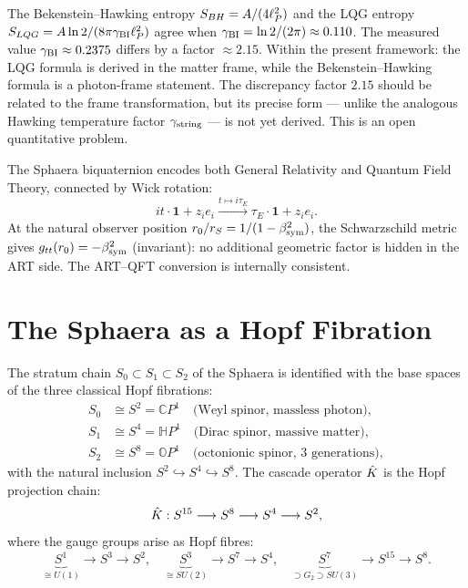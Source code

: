 \begin{remark}
The Bekenstein--Hawking entropy $S_{BH}=A/(4\ell_P^2)$ and the LQG entropy
$S_{LQG}=A\ln 2/(8\pi\gamma_{\mathrm{BI}}\ell_P^2)$ agree when $\gamma_{\mathrm{BI}}=\ln 2/(2\pi)\approx 0.110$.
The measured value $\gamma_{\mathrm{BI}}\approx 0.2375$ differs by a factor $\approx 2.15$.
Within the present framework: the LQG formula is derived in the matter
frame, while the Bekenstein--Hawking formula is a photon-frame statement.
The discrepancy factor $2.15$ should be related to the frame
transformation, but its precise form --- unlike the analogous Hawking
temperature factor $\gamma_{\mathrm{string}}$ --- is not yet derived.
This is an open quantitative problem.
\end{remark}

\begin{theorem}\label{thm:artqft}
The Sphaera biquaternion encodes both General Relativity and Quantum
Field Theory, connected by Wick rotation:
\[
  it\cdot\mathbf{1} + z_i e_i
  \xrightarrow{t\mapsto i\tau_E}
  \tau_E\cdot\mathbf{1} + z_i e_i.
\]
At the natural observer position $r_0/r_S = 1/(1-\beta_{\mathrm{sym}}^2)$, the
Schwarzschild metric gives $g_{tt}(r_0)=-\beta_{\mathrm{sym}}^2$ (invariant): no
additional geometric factor is hidden in the ART side.
The ART--QFT conversion is internally consistent.
\end{theorem}


\section{The Sphaera as a Hopf Fibration}
\label{sec:hopf}

\begin{theorem}\label{thm:hopf}
The stratum chain $S_0\subset S_1\subset S_2$ of the Sphaera is
identified with the base spaces of the three classical Hopf fibrations:
\begin{align*}
  S_0 &\cong S^2 = \mathbb{C}P^1
       \quad\text{(Weyl spinor, massless photon)},\\
  S_1 &\cong S^4 = \mathbb{H}P^1
       \quad\text{(Dirac spinor, massive matter)},\\
  S_2 &\cong S^8 = \mathbb{O}P^1
       \quad\text{(octonionic spinor, 3 generations)},
\end{align*}
with the natural inclusion $S^2\hookrightarrow S^4\hookrightarrow S^8$.
The cascade operator $\hat{K}$ is the Hopf projection chain:
\[
  \hat{K}: S^{15}\longrightarrow S^8\longrightarrow S^4\longrightarrow S^2,
\]
where the gauge groups arise as Hopf fibres:
\[
  \underbrace{S^1}_{\cong U(1)}\to S^3\to S^2,\quad
  \underbrace{S^3}_{\cong SU(2)}\to S^7\to S^4,\quad
  \underbrace{S^7}_{\supset G_2\supset SU(3)}\to S^{15}\to S^8.
\]
\end{theorem}

